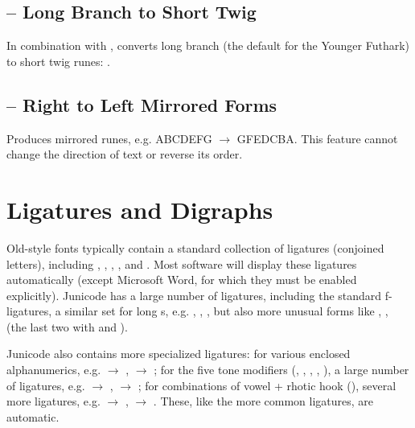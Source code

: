 \subsection{ –
Long Branch to Short Twig}
In combination with , converts long branch (the default for the Younger Futhark) to short twig runes:
{}.

\subsection{
– Right to Left Mirrored Forms}
Produces mirrored runes, e.g. {ABCDEFG $\rightarrow $ GFEDCBA}.
This feature cannot change the direction of text or reverse its order.

\section{Ligatures and Digraphs}

Old-style fonts typically contain a standard collection of ligatures (conjoined letters), including
, , , , and .
Most software will display these ligatures automatically (except
Microsoft Word, for which they must be enabled explicitly). Junicode has a large number of ligatures,
including the standard f-ligatures, a similar set for long s, e.g. , , , but also
more unusual forms like , 
,
(the last two with  and ).

Junicode also contains more specialized ligatures: for various enclosed alphanumerics, e.g.
 $\rightarrow $ ,  $\rightarrow $ ;
for the five tone modifiers
(, , , , ), a large number of
ligatures, e.g.  $\rightarrow $ ,
 $\rightarrow $ ;
for combinations of vowel + rhotic hook (), several more ligatures, e.g.  $\rightarrow $ ,
 $\rightarrow $ .
These, like the more common ligatures, are automatic.


